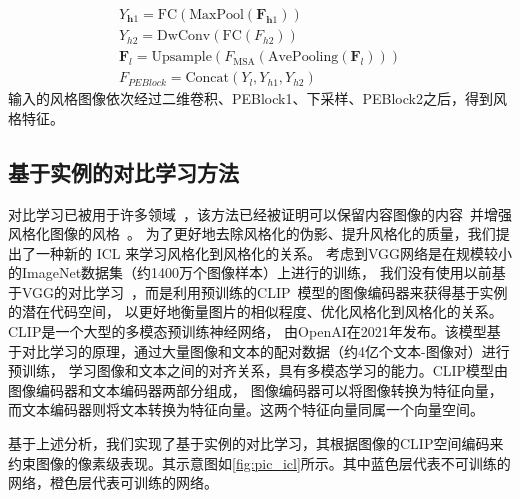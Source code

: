 \begin{equation}
    \label{equ:cal_peblock_fl}
    \begin{gathered}
        Y_{\boldsymbol{h}1}=\mathrm{FC}(\mathrm{MaxPool}(\boldsymbol{F}_{\boldsymbol{h}1})) \\
        Y_{h2}=\mathrm{DwConv}(\mathrm{FC}(F_{h2})) \\
        \boldsymbol{F}_{l}=\mathrm{Upsample}\left(F_{\mathrm{MSA}}(\mathrm{AvePooling}(\boldsymbol{F}_{l}))\right) \\
        F_{PE Block}=\mathrm{Concat}(Y_l,Y_{h1},Y_{h2})
        \end{gathered}
\end{equation}
输入的风格图像依次经过二维卷积、PEBlock1、下采样、PEBlock2之后，得到风格特征。

\subsection{基于实例的对比学习方法}
对比学习已被用于许多领域~\cite{chen2020improved,han2021dual,wu2021contrastive}，该方法已经被证明可以保留内容图像的内容~\cite{han2021dual}并增强风格化图像的风格~\cite{chen2021artistic}。
为了更好地去除风格化的伪影、提升风格化的质量，我们提出了一种新的 ICL 来学习风格化到风格化的关系。
考虑到VGG网络是在规模较小的ImageNet数据集（约1400万个图像样本）上进行的训练，
我们没有使用以前基于VGG的对比学习~\cite{han2021dual}，而是利用预训练的CLIP~\cite{radford2021learning}模型的图像编码器来获得基于实例的潜在代码空间，
以更好地衡量图片的相似程度、优化风格化到风格化的关系。CLIP是一个大型的多模态预训练神经网络，
由OpenAI在2021年发布。‌该模型基于对比学习的原理，通过大量图像和文本的配对数据（约4亿个文本-图像对）进行预训练，
学习图像和文本之间的对齐关系，具有多模态学习的能力。CLIP模型由图像编码器和文本编码器两部分组成，
图像编码器可以将图像转换为特征向量，而文本编码器则将文本转换为特征向量。这两个特征向量同属一个向量空间。

\par 基于上述分析，我们实现了基于实例的对比学习，其根据图像的CLIP空间编码来约束图像的像素级表现。其示意图如\autoref{fig:pic_icl}所示。其中蓝色层代表不可训练的网络，橙色层代表可训练的网络。

